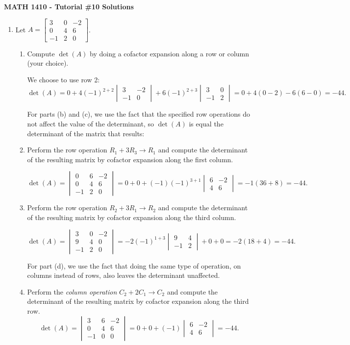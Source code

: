 \documentclass[12pt]{article}
\newcommand{\bbm}{\begin{bmatrix}}
\newcommand{\ebm}{\end{bmatrix}}
\newcommand{\bvm}{\begin{vmatrix}}
\newcommand{\evm}{\end{vmatrix}}
\begin{document}
\author{Instructor: Sean Fitzpatrick}
\thispagestyle{empty}
\begin{center}
{\bf MATH 1410 - Tutorial \#10 Solutions}
\end{center}

 \begin{enumerate}
\item Let $A=\bbm 3&0&-2\\0&4&6\\-1&2&0\ebm$. 
\begin{enumerate}
\item Compute $\det(A)$ by doing a cofactor expansion along a row or column (your choice).

We choose to use row 2:
\[
\det(A) = 0+4(-1)^{2+2}\bvm 3&-2\\-1&0\evm +6(-1)^{2+3}\bvm 3&0\\-1&2\evm = 0+4(0-2)-6(6-0)=-44.
\]

For parts (b) and (c), we use the fact that the specified row operations do not affect the value of the determinant, so $\det(A)$ is equal the determinant of the matrix that results:
\item Perform the row operation $R_1+3R_3\to R_1$ and compute the determinant of the resulting matrix by cofactor expansion along the first column.

\[
\det(A) = \bvm 0&6&-2\\0&4&6\\-1&2&0\evm = 0+0+(-1)(-1)^{3+1}\bvm 6&-2\\4&6\evm = -1(36+8)=-44.
\]

\item Perform the row operation $R_2+3R_1\to R_2$ and compute the determinant of the resulting matrix by cofactor expansion along the third column.

\[
\det(A) = \bvm 3&0&-2\\9&4&0\\-1&2&0\evm = -2(-1)^{1+3}\bvm 9&4\\-1&2\evm+0+0=-2(18+4)=-44.
\]

For part (d), we use the fact that doing the same type of operation, on columns instead of rows, also leaves the determinant unaffected.
\item  Perform the \textit{column operation} $C_2+2C_1\to C_2$ and compute the determinant of the resulting matrix by cofactor expansion along the third row.
\[
\det(A) = \bvm 3&6&-2\\0&4&6\\-1&0&0\evm = 0+0+(-1)\bvm 6&-2\\4&6\evm = -44.
\]
\end{enumerate}
\newpage


\end{enumerate}
\end{document}
